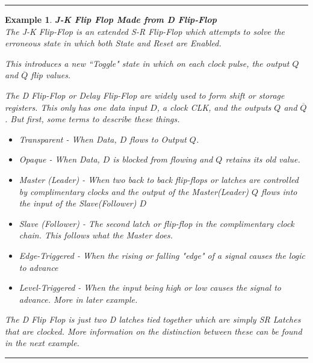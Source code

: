 \documentclass[12pt]{article}
\newtheorem{example}{Example}
\newenvironment{examp}
{
	\vspace{.5cm}
	\hrule
\begin{example}\upshape}
	{\hrule
		\vspace{0.5cm}
\end{example}}
\begin{document}
\begin{examp}
\vspace{.5cm}
\textbf{J-K Flip Flop Made from D Flip-Flop}\\
The \textit{J-K Flip-Flop} is an extended \textit{S-R Flip-Flop} which
attempts to solve the erroneous state in which both State and Reset are
Enabled.

This introduces a new ``Toggle" state in which on each clock pulse, the output
\(Q\) and \(\overline{Q}\) flip values.


\begin{figure}[H]
\end{figure}

The \textit{D Flip-Flop} or \textit{Delay Flip-Flop} are widely used to form
shift or storage registers. This only has one data input \(D\), a clock CLK, and
the outputs \(Q\) and \(\overline{Q}\). But first, some terms to describe
these \textit{things}.
\begin{itemize}
	\item Transparent - When Data, \(D\) flows to Output \(Q\).
	\item Opaque - When Data, \(D\) is blocked from flowing and \(Q\) retains its
	      old value.
	\item Master (Leader) - When two back to back flip-flops or latches are
	      controlled by complimentary clocks and the output of the Master(Leader)
	      \(Q\) flows into the input of the Slave(Follower) \(D\)
	\item Slave (Follower) - The second latch or flip-flop in the complimentary clock
	      chain. This follows what the Master does.
	\item Edge-Triggered - When the rising or falling "edge" of a signal
	      causes the logic to advance
	\item Level-Triggered - When the input being high or low causes the signal
	      to advance. More in later example.
\end{itemize}
The D Flip Flop is just two D latches tied together which are simply SR
Latches that are clocked. More information on the distinction between these can
be found in the next example.


\end{examp}
\end{document}
